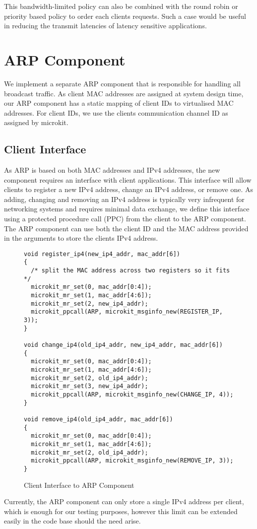 This bandwidth-limited policy can also be combined with the round robin or priority based policy
to order each clients requests. Such a case would be useful in reducing the 
transmit latencies of latency sensitive applications.\\ 


\section{ARP Component}

We implement a separate ARP component that is responsible for handling all broadcast traffic. 
As client MAC addresses are assigned at system design time, our ARP component has a static
mapping of client IDs to virtualised MAC addresses. For client IDs, we use the clients 
communication channel ID as assigned by microkit. 

\subsection{Client Interface}
As ARP is based on both MAC addresses and IPv4 addresses, the new component
requires an interface with client applications. This interface will allow clients
to register a new IPv4 address, change an IPv4 address, or remove one. As adding,
changing and removing an IPv4 address is typically very infrequent for networking systems
and requires minimal data exchange, we define this interface using a protected procedure
call (PPC) from the client to the ARP component. The ARP component can use both the
client ID and the MAC address provided in the arguments to store the clients IPv4 address. 

\begin{figure} [H]
    \begin{verbatim}
void register_ip4(new_ip4_addr, mac_addr[6])
{
  /* split the MAC address across two registers so it fits */
  microkit_mr_set(0, mac_addr[0:4]);
  microkit_mr_set(1, mac_addr[4:6]);
  microkit_mr_set(2, new_ip4_addr);
  microkit_ppcall(ARP, microkit_msginfo_new(REGISTER_IP, 3));
}

void change_ip4(old_ip4_addr, new_ip4_addr, mac_addr[6])
{
  microkit_mr_set(0, mac_addr[0:4]);
  microkit_mr_set(1, mac_addr[4:6]);
  microkit_mr_set(2, old_ip4_addr);
  microkit_mr_set(3, new_ip4_addr);
  microkit_ppcall(ARP, microkit_msginfo_new(CHANGE_IP, 4));
}  

void remove_ip4(old_ip4_addr, mac_addr[6])
{
  microkit_mr_set(0, mac_addr[0:4]);
  microkit_mr_set(1, mac_addr[4:6]);
  microkit_mr_set(2, old_ip4_addr);
  microkit_ppcall(ARP, microkit_msginfo_new(REMOVE_IP, 3));
}
\end{verbatim}
\caption{Client Interface to ARP Component}
\label{l:arpintf}
\end{figure}

Currently, the ARP component can only store a single IPv4 address per client, which
is enough for our testing purposes, however this limit can be extended easily in the code
base should the need arise.\\
